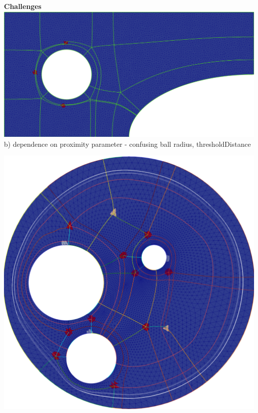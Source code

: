 \documentclass[a0paper,portrait, fontscale=0.30]{baposter}
\begin{document}
\begin{poster}
{%
\noindent
\begin{minipage}[!HT]{0.5\linewidth}
 \textbf{Challenges}
\newline	
\medskip
\includegraphics[width=\textwidth]{HIS4-sim-Rad002}
\label{fig:figure9}
\smallskip
\small b) dependence on proximity parameter - confusing ball radius, thresholdDistance
\end{minipage}
\hspace{0.1\linewidth}
 \begin{minipage}[!HT]{0.38\linewidth}
\includegraphics[width=\textwidth]{Circle_with_circle_holes_refSS1-cycle}

\end{minipage}}
\end{poster}
\end{document}
